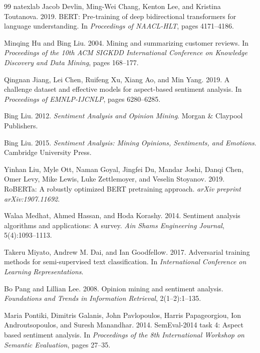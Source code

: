 \documentclass[11pt]{article}
\begin{document}
\begin{thebibliography}{99}
\expandafter\ifx\csname natexlab\endcsname\relax\def\natexlab#1{#1}\fi
{}
Jacob Devlin, Ming-Wei Chang, Kenton Lee, and Kristina Toutanova. 2019. BERT: Pre-training of deep bidirectional transformers for language understanding. In \textit{Proceedings of NAACL-HLT}, pages 4171--4186.

Minqing Hu and Bing Liu. 2004. Mining and summarizing customer reviews. In \textit{Proceedings of the 10th ACM SIGKDD International Conference on Knowledge Discovery and Data Mining}, pages 168--177.

Qingnan Jiang, Lei Chen, Ruifeng Xu, Xiang Ao, and Min Yang. 2019. A challenge dataset and effective models for aspect-based sentiment analysis. In \textit{Proceedings of EMNLP-IJCNLP}, pages 6280--6285.

Bing Liu. 2012. \textit{Sentiment Analysis and Opinion Mining}. Morgan \& Claypool Publishers.

Bing Liu. 2015. \textit{Sentiment Analysis: Mining Opinions, Sentiments, and Emotions}. Cambridge University Press.

Yinhan Liu, Myle Ott, Naman Goyal, Jingfei Du, Mandar Joshi, Danqi Chen, Omer Levy, Mike Lewis, Luke Zettlemoyer, and Veselin Stoyanov. 2019. RoBERTa: A robustly optimized BERT pretraining approach. \textit{arXiv preprint arXiv:1907.11692}.

Walaa Medhat, Ahmed Hassan, and Hoda Korashy. 2014. Sentiment analysis algorithms and applications: A survey. \textit{Ain Shams Engineering Journal}, 5(4):1093--1113.

Takeru Miyato, Andrew M. Dai, and Ian Goodfellow. 2017. Adversarial training methods for semi-supervised text classification. In \textit{International Conference on Learning Representations}.

Bo Pang and Lillian Lee. 2008. Opinion mining and sentiment analysis. \textit{Foundations and Trends in Information Retrieval}, 2(1--2):1--135.

Maria Pontiki, Dimitris Galanis, John Pavlopoulos, Harris Papageorgiou, Ion Androutsopoulos, and Suresh Manandhar. 2014. SemEval-2014 task 4: Aspect based sentiment analysis. In \textit{Proceedings of the 8th International Workshop on Semantic Evaluation}, pages 27--35.


\end{thebibliography}
\end{document}
